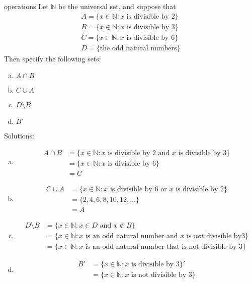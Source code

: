 \begin{example}{operations}
Let ${\mathbb N}$ be the universal set, and suppose that
\begin{align*}
A = \{ x \in {\mathbb N} : x \text{ is divisible by 2}\} \\ 
B = \{ x \in {\mathbb N} : x \text{ is divisible by 3}\} \\ 
C = \{ x \in {\mathbb N} : x \text{ is divisible by 6}\} \\
D = \{\text{the odd natural numbers}\}
\end{align*} 
Then specify the following sets:
\begin{enumerate}[(a)]
\item 
$A \cap B$
\item
$C \cup A$
\item
 $D \setminus B$
\item
$B'$
\end{enumerate}

\noindent
Solutions:
\begin{enumerate}[(a)]
\item
\begin{align*}
A \cap B &= \{ x \in {\mathbb N} : x \text{ is divisible by 2} \text{ and } x \text{ is divisible by 3}\} \\
& = \{ x \in {\mathbb N} : x \text{ is divisible by 6}\} \\
& = C
\end{align*}
\item
\begin{align*}
C \cup A &= \{ x \in {\mathbb N} : x \text{ is divisible by 6} \text{ or } x \text{ is divisible by 2}\} \\
&= \{2, 4, 6, 8, 10, 12, \ldots \} \\
&= A
\end{align*}
\item
\begin{align*}
D \setminus B &= \{ x \in {\mathbb N} : x \in D \text{ and } x \notin B \} \\
&= \{ x \in {\mathbb N} : x \text{ is an odd natural number and } x \text{ is } not \text{ divisible by} 3 \} \\
&= \{  x \in {\mathbb N} : x \text{ is an odd natural number that is not divisible by 3} \} 
\end{align*} 
\item
\begin{align*}
B' &= \{ x \in {\mathbb N} : x \text{ is divisible by 3}\}' \\
&= \{ x \in {\mathbb N} : x \text{ is not divisible by 3}\}
\end{align*}
\end{enumerate} 
\end{example}


